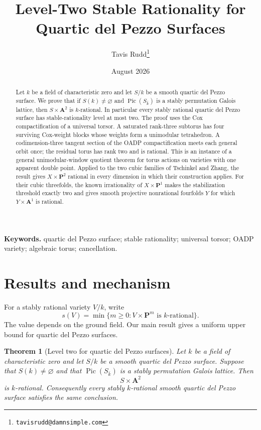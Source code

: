 \documentclass[11pt]{article}
\title{Level-Two Stable Rationality for Quartic del Pezzo Surfaces}
\author{Tavis Rudd\thanks{\texttt{tavisrudd@damnsimple.com}}}
\date{August 2026}
\newtheorem{theorem}{Theorem}[section]
\theoremstyle{remark}
\newcommand{\A}{\mathbf A}
\newcommand{\PP}{\mathbf P}
\newcommand{\Pic}{\operatorname{Pic}}
\begin{document}
\maketitle

\begin{abstract}
Let \(k\) be a field of characteristic zero and let \(S/k\) be a smooth
quartic del Pezzo surface.  We prove that if \(S(k)\ne\varnothing\) and
\(\Pic(S_{\bar k})\) is a stably permutation Galois lattice, then
\(S\times\A^2\) is \(k\)-rational.  In particular every stably rational
quartic del Pezzo surface has stable-rationality level at most two.  The
proof uses the Cox compactification of a universal torsor.  A saturated
rank-three subtorus has four surviving Cox-weight blocks whose weights form
a unimodular tetrahedron.  A codimension-three tangent section of the OADP
compactification meets each general orbit once; the residual torus has rank
two and is rational.  This is an instance of a general unimodular-window
quotient theorem for torus actions on varieties with one apparent double
point.  Applied to the two cubic families of Tschinkel and Zhang, the result
gives \(X\times\PP^2\) rational in every dimension in which their construction
applies.  For their cubic threefolds, the known irrationality of
\(X\times\PP^1\) makes the stabilization threshold exactly two and gives
smooth projective nonrational fourfolds \(Y\) for which \(Y\times\A^1\) is
rational.
\end{abstract}

\noindent\textbf{Keywords.} quartic del Pezzo surface; stable rationality;
universal torsor; OADP variety; algebraic torus; cancellation.

\section{Results and mechanism}

For a stably rational variety \(V/k\), write
\[
 s(V)=\min\{m\geq0:V\times\PP^m\text{ is }k\text{-rational}\}.
\]
The value depends on the ground field.  Our main result gives a uniform
upper bound for quartic del Pezzo surfaces.

\begin{theorem}[Level two for quartic del Pezzo surfaces]
\label{thm:level-two}
%
%
%
Let \(k\) be a field of characteristic zero and let \(S/k\) be a smooth
quartic del Pezzo surface.  Suppose that \(S(k)\ne\varnothing\) and that
\(\Pic(S_{\bar k})\) is a stably permutation Galois lattice.  Then
\[
 S\times\A^2
\]
is \(k\)-rational.  Consequently every stably \(k\)-rational smooth quartic
del Pezzo surface satisfies the same conclusion.
\end{theorem}
\end{document}
